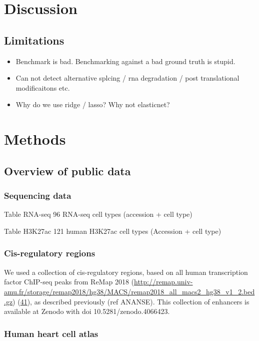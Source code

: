 \section{Discussion}

\subsection{Limitations}
\begin{itemize}
    \item Benchmark is bad. Benchmarking against a bad ground truth is stupid.
    \item Can not detect alternative splcing / rna degradation / post translational modificaitons etc.
    \item Why do we use ridge / lasso? Why not elasticnet?
\end{itemize}

\section{Methods}

\subsection{Overview of public data}

\subsubsection{Sequencing data}

Table RNA-seq
 96  RNA-seq cell types (accession + cell type)
 
 Table H3K27ac
 121 human H3K27ac cell types (Accession + cell type)

\subsubsection{Cis-regulatory regions}

We used a collection of cis-regulatory regions, based on all human transcription factor ChIP-seq peaks from ReMap 2018 (\href{http://remap.univ-amu.fr/storage/remap2018/hg38/MACS/remap2018_all_macs2_hg38_v1_2.bed.gz}{http://remap.univ-amu.fr/storage/remap2018/hg38/MACS/remap2018\_all\_macs2\_hg38\_v1\_2.bed.gz}) (\href{javascript:;}{41}), as described previously (ref ANANSE). This collection of enhancers is available at Zenodo with doi 10.5281/zenodo.4066423.

\subsubsection{Human heart cell atlas}

